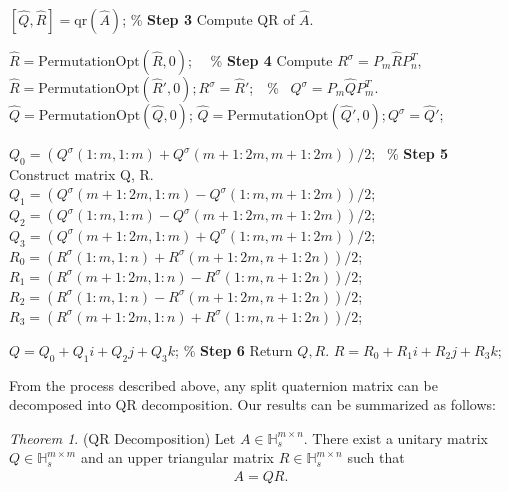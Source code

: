 \documentclass{book}
\theoremstyle{remark}
\newtheorem{theorem}{\it\indent Theorem}[section]
\begin{document}
\begin{multicols}{2}
\begin{algorithm}[htbp]
\begin{algorithmic}[1]
        \State \([\widehat{Q},\widehat{R}] = \text{qr}(\widehat{A})\); \qquad\qquad\qquad\qquad\qquad\qquad\qquad\qquad\qquad\quad\% \textbf{Step 3} Compute QR of $\widehat{A}$.
        
        \State $\widehat{R}=\text{PermutationOpt}(\widehat{R},0)$; \qquad\qquad\qquad\qquad\qquad\qquad\quad\ \ \% \textbf{Step 4} Compute \(R^\sigma = P_{m}\widehat{R}P_{n}^T\), 
        \State $\widehat{R}=\text{PermutationOpt}(\widehat{R}',0);R^\sigma=\widehat{R}'$;\qquad\qquad\qquad\qquad\quad\ \ \% \qquad\quad \ \(Q^\sigma = P_{m}\widehat{Q}P_{m}^T\).
        \State $\widehat{Q}=\text{PermutationOpt}(\widehat{Q},0)$;
        \State $\widehat{Q}=\text{PermutationOpt}(\widehat{Q}',0);Q^\sigma=\widehat{Q}'$;
        
        \State $Q_0 = (Q^\sigma(1\!:\!m,1\!:\!m) + Q^\sigma(m+1\!:\!2m,m+1\!:\!2m))/2$; \qquad\ \% \textbf{Step 5} Construct matrix Q, R.
        \State $Q_1 = (Q^\sigma(m+1\!:\!2m,1\!:\!m) - Q^\sigma(1\!:\!m,m+1\!:\!2m))/2$;
        \State $Q_2 = (Q^\sigma(1\!:\!m,1\!:\!m) - Q^\sigma(m+1\!:\!2m,m+1\!:\!2m))/2$;
        \State $Q_3 = (Q^\sigma(m+1\!:\!2m,1\!:\!m) + Q^\sigma(1\!:\!m,m+1\!:\!2m))/2$;
        \State $R_0 = (R^\sigma(1\!:\!m,1\!:\!n) + R^\sigma(m+1\!:\!2m,n+1\!:\!2n))/2$;
        \State $R_1 = (R^\sigma(m+1\!:\!2m,1\!:\!n) - R^\sigma(1\!:\!m,n+1\!:\!2n))/2$;
        \State $R_2 = (R^\sigma(1\!:\!m,1\!:\!n) - R^\sigma(m+1\!:\!2m,n+1\!:\!2n))/2$;
        \State $R_3 = (R^\sigma(m+1\!:\!2m,1\!:\!n) + R^\sigma(1\!:\!m,n+1\!:\!2n))/2$;

        \State $Q = Q_0 + Q_1i + Q_2j + Q_3k$; \qquad\qquad\qquad\qquad\qquad\qquad\qquad\% \textbf{Step 6} Return $Q, R$.
        \State $R = R_0 + R_1i + R_2j + R_3k$;
    \End 
    \end{algorithmic}
\end{algorithm}

From the process described above, any split quaternion matrix can be decomposed into QR decomposition. Our results can be summarized as follows:
\begin{theorem}(QR Decomposition)
    Let $A \in \mathbb{H}_s^{m \times n}$. There exist a unitary matrix $Q \in \mathbb{H}_s^{m \times m}$ and an upper triangular matrix $R \in \mathbb{H}_s^{m \times n}$ such that
    \begin{eqnarray}\label{eq:split QR}
        A = Q R.
    \end{eqnarray}
\end{theorem}


\end{multicols}
\end{document}

